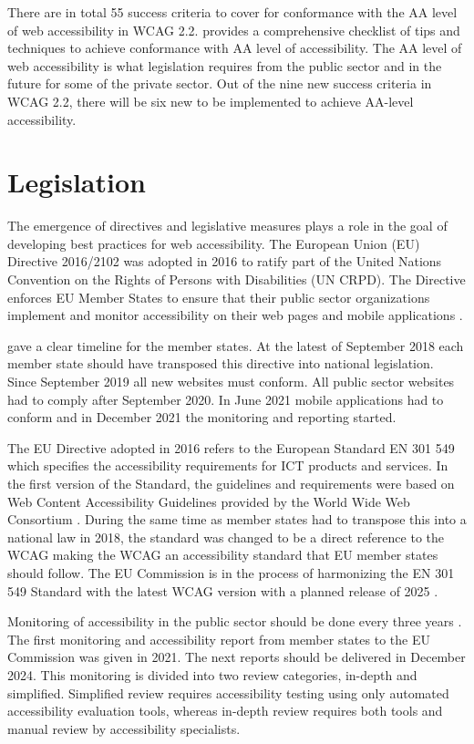 There are in total 55 success criteria to cover for conformance with the AA level of web accessibility in WCAG 2.2. \textcite{wcag_checklist} provides a comprehensive checklist of tips and techniques to achieve conformance with AA level of accessibility. The AA level of web accessibility is what legislation requires from the public sector and in the future for some of the private sector.  Out of the nine new success criteria in WCAG 2.2, there will be six new to be implemented to achieve AA-level accessibility.


\section{Legislation}

The emergence of directives and legislative measures plays a role in the goal of developing best practices for web accessibility. The European Union (EU) Directive 2016/2102 was adopted in 2016 to ratify part of the United Nations Convention on the Rights of Persons with Disabilities (UN CRPD). The Directive enforces EU Member States to ensure that their public sector organizations implement and monitor accessibility on their web pages and mobile applications \citep{eudirective2016}. 

\textcite{eudirective2016} gave a clear timeline for the member states. At the latest of September 2018 each member state should have transposed this directive into national legislation. Since September 2019 all new websites must conform. All public sector websites had to comply after September 2020. In June 2021 mobile applications had to conform and in December 2021 the monitoring and reporting started. 

The EU Directive adopted in 2016 refers to the European Standard EN 301 549 which specifies the accessibility requirements for ICT products and services. In the first version of the Standard, the guidelines and requirements were based on Web Content Accessibility Guidelines provided by the World Wide Web Consortium \citep{wcagadoptioneurope}. During the same time as member states had to transpose this into a national law in 2018, the standard was changed to be a direct reference to the WCAG making the WCAG an accessibility standard that EU member states should follow. The EU Commission is in the process of harmonizing the EN 301 549 Standard with the latest WCAG version with a planned release of 2025 \citep{etsi_standard}.

Monitoring of accessibility in the public sector should be done every three years \citep{eudirectivemonitoring}. The first monitoring and accessibility report from member states to the EU Commission was given in 2021. The next reports should be delivered in December 2024. This monitoring is divided into two review categories, in-depth and simplified. Simplified review requires accessibility testing using only automated accessibility evaluation tools, whereas in-depth review requires both tools and manual review by accessibility specialists. 

